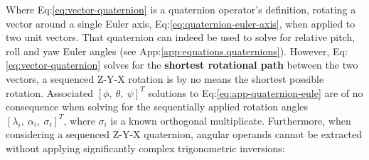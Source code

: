 Where Eq:\ref{eq:vector-quaternion} is a quaternion operator's definition, rotating a vector around a single Euler axis, Eq:\ref{eq:quaternion-euler-axis}, when applied to two unit vectors. That quaternion can indeed be used to solve for relative pitch, roll and yaw Euler angles (see App:\ref{app:equations.quaternions}). However, Eq:\ref{eq:vector-quaternion} solves for the \textbf{shortest rotational path} between the two vectors, a sequenced Z-Y-X rotation is by no means the shortest possible rotation. Associated $[\phi,~\theta,~\psi]^T$ solutions to Eq:\ref{eq:app-quaternion-eule} are of no consequence when solving for the sequentially applied rotation angles $[\lambda_i,~\alpha_i,~\sigma_i]^T$, where $\sigma_i$ is a known orthogonal multiplicate. Furthermore, when considering a sequenced Z-Y-X quaternion, angular operands cannot be extracted without applying significantly complex trigonometric inversions:
